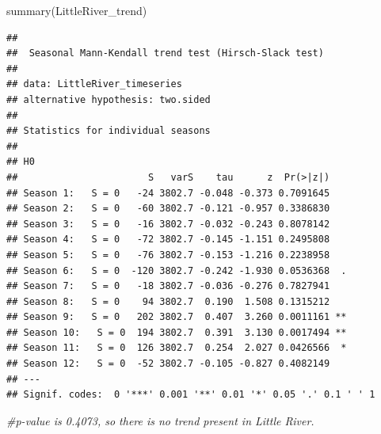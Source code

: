 \documentclass[
  12pt,
]{article}
\newenvironment{Shaded}{\begin{snugshade}}{\end{snugshade}}
\newcommand{\AttributeTok}[1]{\textcolor[rgb]{0.77,0.63,0.00}{#1}}
\newcommand{\CommentTok}[1]{\textcolor[rgb]{0.56,0.35,0.01}{\textit{#1}}}
\newcommand{\DecValTok}[1]{\textcolor[rgb]{0.00,0.00,0.81}{#1}}
\newcommand{\FunctionTok}[1]{\textcolor[rgb]{0.00,0.00,0.00}{#1}}
\newcommand{\NormalTok}[1]{#1}
\newcommand{\OtherTok}[1]{\textcolor[rgb]{0.56,0.35,0.01}{#1}}
\newcommand{\SpecialCharTok}[1]{\textcolor[rgb]{0.00,0.00,0.00}{#1}}
\newcommand{\StringTok}[1]{\textcolor[rgb]{0.31,0.60,0.02}{#1}}
\begin{document}
\begin{Shaded}
\begin{Highlighting}[]
\FunctionTok{summary}\NormalTok{(LittleRiver\_trend)}
\end{Highlighting}
\end{Shaded}

\begin{verbatim}
## 
##  Seasonal Mann-Kendall trend test (Hirsch-Slack test)
## 
## data: LittleRiver_timeseries
## alternative hypothesis: two.sided
## 
## Statistics for individual seasons
## 
## H0
##                       S   varS    tau      z  Pr(>|z|)   
## Season 1:   S = 0   -24 3802.7 -0.048 -0.373 0.7091645   
## Season 2:   S = 0   -60 3802.7 -0.121 -0.957 0.3386830   
## Season 3:   S = 0   -16 3802.7 -0.032 -0.243 0.8078142   
## Season 4:   S = 0   -72 3802.7 -0.145 -1.151 0.2495808   
## Season 5:   S = 0   -76 3802.7 -0.153 -1.216 0.2238958   
## Season 6:   S = 0  -120 3802.7 -0.242 -1.930 0.0536368  .
## Season 7:   S = 0   -18 3802.7 -0.036 -0.276 0.7827941   
## Season 8:   S = 0    94 3802.7  0.190  1.508 0.1315212   
## Season 9:   S = 0   202 3802.7  0.407  3.260 0.0011161 **
## Season 10:   S = 0  194 3802.7  0.391  3.130 0.0017494 **
## Season 11:   S = 0  126 3802.7  0.254  2.027 0.0426566  *
## Season 12:   S = 0  -52 3802.7 -0.105 -0.827 0.4082149   
## ---
## Signif. codes:  0 '***' 0.001 '**' 0.01 '*' 0.05 '.' 0.1 ' ' 1
\end{verbatim}

\begin{Shaded}
\begin{Highlighting}[]
\CommentTok{\#p{-}value is 0.4073, so there is no trend present in Little River.}
\end{Highlighting}
\end{Shaded}

\begin{Shaded}
\end{Shaded}
\end{document}
